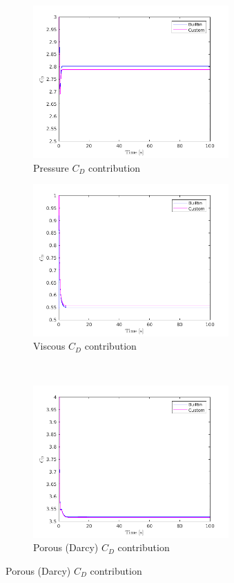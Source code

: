 \documentclass[a4paper,11pt]{report}
\begin{document}
\begin{figure}[ht]
    \centering
    \begin{subfigure}[b]{75mm}
        \includegraphics[width=75mm]{"pressure_x.png"}
        \caption{Pressure $C_D$ contribution}
        \label{fig:pty075_Da1e-2}
    \end{subfigure}
    \begin{subfigure}[b]{75mm}
        \includegraphics[width=75mm]{"viscous_x.png"}
        \caption{Viscous $C_D$ contribution}
        \label{fig:pty075_Da1e-4}
    \end{subfigure}
    \\
    \begin{subfigure}[b]{75mm}
        \includegraphics[width=75mm]{"porous_x.png"}
        \caption{Porous (Darcy) $C_D$ contribution}
        \label{fig:pty095_Da1e-2}
    \end{subfigure}

\end{figure}
\end{document}
